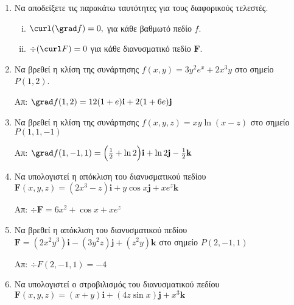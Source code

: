 


\pagestyle{askhseis}
\everymath{\displaystyle}
\renewcommand{\vec}{\mathbf}



\begin{center}
  \minibox{\large\bf \textcolor{Col1}{Κλίση, Απόκλιση, Στροβιλισμός}}
\end{center}

\vspace{\baselineskip}

\begin{enumerate}

  \item Να αποδείξετε τις παρακάτω ταυτότητες για τους διαφορικούς τελεστές.

    \begin{enumerate}[i)]
      \item $\curl(\grad f)=0, $ για κάθε βαθμωτό πεδίο $f$.
      \item $\div(\curl F)=0$ για κάθε διανυσματικό πεδίο $ \mathbf{F} $.
    \end{enumerate}

  \item Να βρεθεί η κλίση της συνάρτησης $ f(x,y)=3y^2e^x+2x^3y $ στο σημείο $P(1,2)$.

    \hfill Απ: $\grad f(1,2)=12(1+e)\vec{i}+2(1+6e)\vec{j}$

  \item Να βρεθεί η κλίση της συνάρτησης $ f(x,y, z)=xy\ln(x-z) $ στο σημείο $P(1,1,-1)$

    \hfill Απ: $\grad f(1,-1,1)=\Bigl(\frac{1}{2}+\ln2\Bigr)\vec{i}+\ln 2\vec{j}- 
    \frac{1}{2}\vec{k} $


  \item Να υπολογιστεί η απόκλιση του διανυσματικού πεδίου
    $ \boldsymbol{F}(x,y,z)=(2x^3-z)\vec{i}+y\cos x\vec{j}+xe^z\vec{k} $

    \hfill Απ: $\div\boldsymbol{F}=6x^2+\cos x+xe^z$

  \item Να βρεθεί η απόκλιση του διανυσματικού πεδίου 
    $ \boldsymbol{F}=(2x^2y^3)\vec{i}-(3y^2z)\vec{j}+(z^2y)\vec{k} $ στο σημείο $P(2,-1,1)$

    \hfill Απ: $\div F(2,-1,1)=-4$

  \item Να υπολογιστεί ο στροβιλισμός του διανυσματικού πεδίου
    $ \boldsymbol{F}(x,y,z)=(x+y)\vec{i}+(4z\sin x)\vec{j}+x^3\vec{k} $


\end{enumerate}
